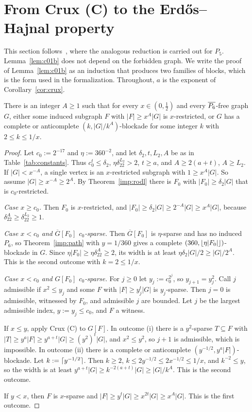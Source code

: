 \section{From Crux (C) to the Erd\H{o}s--Hajnal property}\label{sec:c01}

This section follows~\cite[Section 7]{NSS7}, where the analogous reduction is carried out for $P_5$.
Lemma~\ref{lem:c01b} does not depend on the forbidden graph. We write the proof of
Lemma~\ref{lem:c01b} as an induction that produces two families of blocks, which is the form used in the
formalization. Throughout, $a$ is the exponent of Corollary~\ref{cor:crux}.

\begin{lemma}\label{lem:c01a}
There is an integer $A\ge1$ such that for every $x\in(0,\frac12)$ and every $\overline{P_6}$-free graph $G$, either
some induced subgraph $F$ with $|F|\ge x^A|G|$ is $x$-restricted, or $G$ has a complete or anticomplete
$(k,|G|/k^A)$-blockade for some integer $k$ with $2\le k\le1/x$.
\end{lemma}
\begin{proof}
Let $c_0:=2^{-17}$ and $\eta:=360^{-2}$, and let $\delta_2,t,L_2,A$ be as in Table~\ref{tab:constants}. Thus
$c_0^t\le\delta_2$, $\eta\delta_22^{L_2}>2$, $t\ge a$, and $A\ge2(a+t)$, $A\ge L_2$. If $|G|<x^{-A}$, a single
vertex is an $x$-restricted subgraph with $1\ge x^A|G|$. So assume $|G|\ge x^{-A}\ge2^A$. By
Theorem~\ref{imp:rodl} there is $F_0$ with $|F_0|\ge\delta_2|G|$ that is $c_0$-restricted.

\emph{Case $x\ge c_0$.} Then $F_0$ is $x$-restricted, and $|F_0|\ge\delta_2|G|\ge2^{-A}|G|\ge x^A|G|$, because
$\delta_22^A\ge\delta_22^{L_2}\ge1$.

\emph{Case $x<c_0$ and $\overline G[F_0]$ $c_0$-sparse.} Then $\overline G[F_0]$ is $\eta$-sparse and has no
induced $P_6$, so Theorem~\ref{imp:path} with $y=1/360$ gives a complete $(360,\lfloor \eta|F_0|\rfloor)$-blockade in
$G$. Since $\eta|F_0|\ge\eta\delta_22^A\ge2$, its width is at least $\eta\delta_2|G|/2\ge|G|/2^A$. This is the
second outcome with $k=2\le1/x$.

\emph{Case $x<c_0$ and $G[F_0]$ $c_0$-sparse.} For $j\ge0$ let $y_j:=c_0^{2^j}$, so $y_{j+1}=y_j^2$. Call $j$
admissible if $x^2\le y_j$ and some $F$ with $|F|\ge y_j^t|G|$ is $y_j$-sparse. Then $j=0$ is admissible,
witnessed by $F_0$, and admissible $j$ are bounded. Let $j$ be the largest admissible index, $y:=y_j\le c_0$,
and $F$ a witness.

If $x\le y$, apply Crux (C) to $G[F]$. In outcome (i) there is a $y^2$-sparse $T\subseteq F$ with
$|T|\ge y^a|F|\ge y^{a+t}|G|\ge(y^2)^t|G|$, and $x^2\le y^2$, so $j+1$ is admissible, which is impossible. In
outcome (ii) there is a complete or anticomplete $(y^{-1/2},y^a|F|)$-blockade. Let $k:=\lceil y^{-1/2}\rceil$. Then
$k\ge2$, $k\le2y^{-1/2}\le2x^{-1/2}\le1/x$, and $k^{-2}\le y$, so the width is at least $y^{a+t}|G|\ge
k^{-2(a+t)}|G|\ge|G|/k^A$. This is the second outcome.

If $y<x$, then $F$ is $x$-sparse and $|F|\ge y^t|G|\ge x^{2t}|G|\ge x^A|G|$. This is the first outcome.
\end{proof}


